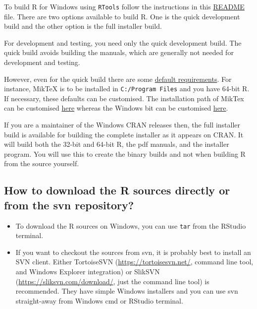 \documentclass[
]{book}
\begin{document}
To build R for Windows using \texttt{RTools} follow the instructions in this \href{https://github.com/r-windows/r-base\#readme}{README} file.
There are two options available to build R.
One is the quick development build and the other option is the full installer build.

For development and testing, you need only the quick development build.
The quick build avoids building the manuals, which are generally not needed for development and testing.

However, even for the quick build there are some \href{https://github.com/r-windows/r-base/blob/master/quick-build.sh}{default requirements}.
For instance, MikTeX is to be installed in \texttt{C:/Program\ Files} and you have 64-bit R.
If necessary, these defaults can be customised.
The installation path of MikTex can be customised \href{https://github.com/r-windows/r-base/blob/50a229fc76c50a5fb42c0daa367466aaf2318171/quick-build.sh\#L13}{here} whereas the Windows bit can be customised \href{https://github.com/r-windows/r-base/blob/50a229fc76c50a5fb42c0daa367466aaf2318171/quick-build.sh\#L6}{here}.

If you are a maintainer of the Windows CRAN releases then, the full installer build is available for building the complete installer as it appears on CRAN.
It will build both the 32-bit and 64-bit R, the pdf manuals, and the installer program.
You will use this to create the binary builds and not when building R from the source yourself.

\hypertarget{how-to-download-the-r-sources-directly-or-from-the-svn-repository}{%
\subsection{How to download the R sources directly or from the svn repository?}\label{how-to-download-the-r-sources-directly-or-from-the-svn-repository}}

\begin{itemize}
\item
  To download the R sources on Windows, you can use \texttt{tar} from the RStudio terminal.
\item
  If you want to checkout the sources from svn, it is probably best to install an SVN client.
  Either TortoiseSVN (\url{https://tortoisesvn.net/}, command line tool, and Windows Explorer integration) or SlikSVN (\url{https://sliksvn.com/download/}, just the command line tool) is recommended.
  They have simple Windows installers and you can use svn straight-away from Windows cmd or RStudio terminal.
\end{itemize}
\end{document}
